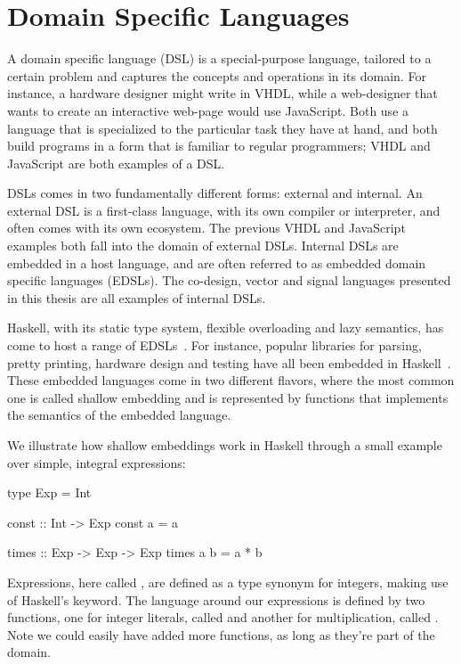 \documentclass[../main.tex]{subfiles}
\begin{document}
\section{Domain Specific Languages}
\label{domain}

A domain specific language (DSL) is a special-purpose language, tailored to a certain problem and captures the concepts and operations in its domain. For instance, a hardware designer might write in VHDL, while a web-designer that wants to create an interactive web-page would use JavaScript. Both use a language that is specialized to the particular task they have at hand, and both build programs in a form that is familiar to regular programmers; VHDL and JavaScript are both examples of a DSL.

DSLs comes in two fundamentally different forms: external and internal. An external DSL is a first-class language, with its own compiler or interpreter, and often comes with its own ecosystem. The previous VHDL and JavaScript examples both fall into the domain of external DSLs. Internal DSLs are embedded in a host language, and are often referred to as embedded domain specific languages (EDSLs). The co-design, vector and signal languages presented in this thesis are all examples of internal DSLs.


Haskell, with its static type system, flexible overloading and lazy semantics, has come to host a range of EDSLs~\cite{elliott2003}. For instance, popular libraries for parsing, pretty printing, hardware design and testing have all been embedded in Haskell~\cite{leijen2002, hughes1995, bjesse1998}. These embedded languages come in two different flavors, where the most common one is called shallow embedding and is represented by functions that implements the semantics of the embedded language.

We illustrate how shallow embeddings work in Haskell through a small example over simple, integral expressions:

\begin{code}
type Exp = Int

const :: Int -> Exp
const a = a

times :: Exp -> Exp -> Exp
times a b = a * b
\end{code}

\noindent Expressions, here called , are defined as a type synonym for integers, making use of Haskell's  keyword. The language around our expressions is defined by two functions, one for integer literals, called  and another for multiplication, called . Note we could easily have added more functions, as long as they're part of the domain.
\end{document}
